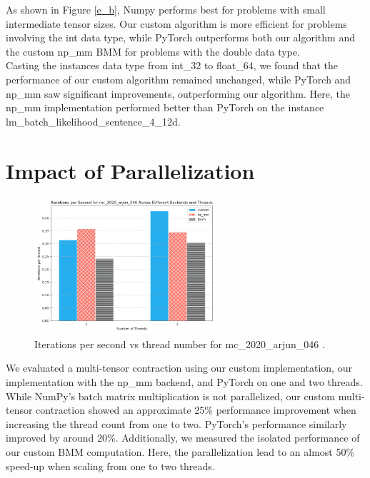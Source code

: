\sloppy
\noindent As shown in Figure \ref{e_b}, Numpy performs best for problems with small intermediate tensor sizes. Our custom algorithm is more efficient for problems involving the int data type, while PyTorch outperforms both our algorithm and the custom np\_mm BMM for problems with the double data type.\\
Casting the instances data type from int\_32 to float\_64, we found that the performance of our custom algorithm remained unchanged, while PyTorch and np\_mm saw significant improvements, outperforming our algorithm. Here, the np\_mm implementation performed better than PyTorch on the instance lm\_batch\_likelihood\_sentence\_4\_12d.


\section{Impact of Parallelization}
\begin{figure}[H]
    \centering
    \includegraphics[width=0.6\textwidth]{images/threads.png}  %
    \caption{Iterations per second vs thread number for mc\_2020\_arjun\_046 \cite{blacher2024einsum}.}
    \label{threads}
\end{figure}
\noindent We evaluated a multi-tensor contraction using our custom implementation, our implementation with the np\_mm backend, and PyTorch on one and two threads. While NumPy’s batch matrix multiplication is not parallelized, our custom multi-tensor contraction showed an approximate 25\% performance improvement when increasing the thread count from one to two. PyTorch’s performance similarly improved by around 20\%. Additionally, we measured the isolated performance of our custom BMM computation. Here, the parallelization lead to an almost 50\% speed-up when scaling from one to two threads. 
